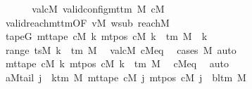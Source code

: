 \begin{isabellebody}
\ \ %
\isanewline
\ \ \isamarkupfalse%
\ valcM{\isacharcolon}{\kern0pt}\ {\isachardoublequoteopen}valid{\isacharunderscore}{\kern0pt}config{\isacharunderscore}{\kern0pt}mttm\ M\ cM{\isachardoublequoteclose}\isanewline
\ \ \ \ \isamarkupfalse%
\ valid{\isacharunderscore}{\kern0pt}reach{\isacharunderscore}{\kern0pt}mttm{\isacharbrackleft}{\kern0pt}OF\ vM\ w{\isacharunderscore}{\kern0pt}sub\ reach{\isacharunderscore}{\kern0pt}M{\isacharbrackright}{\kern0pt}\ \isakeywordONE{{\isachardot}{\kern0pt}}\isamarkupfalse%
\isanewline
\ \ \isamarkupfalse%
\ tapeG{\isacharcolon}{\kern0pt}\ {\isachardoublequoteopen}mt{\isacharunderscore}{\kern0pt}tape\ cM\ k\ {\isacharparenleft}{\kern0pt}mt{\isacharunderscore}{\kern0pt}pos\ cM\ k{\isacharparenright}{\kern0pt}\ {\isasymin}\ {\isasymGamma}{\isacharunderscore}{\kern0pt}tm\ M{\isachardoublequoteclose}\ \ k\isanewline
\ \ \isamarkupfalse%
\ {\isacharminus}{\kern0pt}\isanewline
\ \ \ \ \isamarkupfalse%
\ {\isachardoublequoteopen}range\ {\isacharparenleft}{\kern0pt}tsM\ k{\isacharparenright}{\kern0pt}\ {\isasymsubseteq}\ {\isasymGamma}{\isacharunderscore}{\kern0pt}tm\ M{\isachardoublequoteclose}\ \isamarkupfalse%
\ valcM\ cM{\isacharunderscore}{\kern0pt}eq\ \isamarkupfalse%
\ {\isacharparenleft}{\kern0pt}cases\ M{\isacharparenright}{\kern0pt}\ auto\isanewline
\ \ \ \ \isamarkupfalse%
\ {\isachardoublequoteopen}mt{\isacharunderscore}{\kern0pt}tape\ cM\ k\ {\isacharparenleft}{\kern0pt}mt{\isacharunderscore}{\kern0pt}pos\ cM\ k{\isacharparenright}{\kern0pt}\ {\isasymin}\ {\isasymGamma}{\isacharunderscore}{\kern0pt}tm\ M{\isachardoublequoteclose}\ \isamarkupfalse%
\ cM{\isacharunderscore}{\kern0pt}eq\ \isamarkupfalse%
\ auto\isanewline
\ \ \isamarkupfalse%
\isanewline
\ \ \isamarkupfalse%
\ aM{\isacharunderscore}{\kern0pt}tail{\isacharcolon}{\kern0pt}\ {\isachardoublequoteopen}{\isasymforall}j\ {\isasymge}\ k{\isacharunderscore}{\kern0pt}tm\ M{\isachardot}{\kern0pt}\ mt{\isacharunderscore}{\kern0pt}tape\ cM\ j\ {\isacharparenleft}{\kern0pt}mt{\isacharunderscore}{\kern0pt}pos\ cM\ j{\isacharparenright}{\kern0pt}\ {\isacharequal}{\kern0pt}\ bl{\isacharunderscore}{\kern0pt}tm\ M{\isachardoublequoteclose}\isanewline
\ \ \ \ \isamarkupfalse%

\end{isabellebody}
